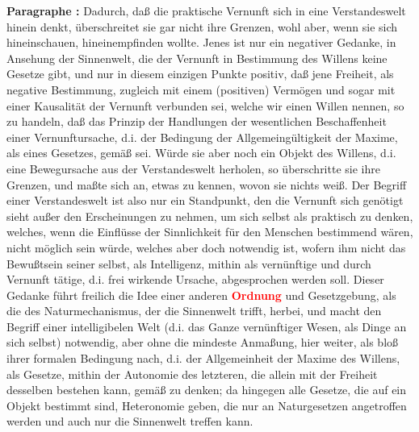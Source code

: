 \documentclass[a4paper,12pt,twoside]{book}
\newcommand{\match}[1]{\textcolor{red}{\textbf{#1}}}
\begin{document}
	\noindent\textbf{Paragraphe : }Dadurch, daß die praktische Vernunft sich in eine Verstandeswelt hinein denkt, überschreitet sie gar nicht ihre Grenzen, wohl aber, wenn sie sich hineinschauen, hineinempfinden wollte. Jenes ist nur ein negativer Gedanke, in Ansehung der Sinnenwelt, die der Vernunft in Bestimmung des Willens keine Gesetze gibt, und nur in diesem einzigen Punkte positiv, daß jene Freiheit, als negative Bestimmung, zugleich mit einem (positiven) Vermögen und sogar mit einer Kausalität der Vernunft verbunden sei, welche wir einen Willen nennen, so zu handeln, daß das Prinzip der Handlungen der wesentlichen Beschaffenheit einer Vernunftursache, d.i. der Bedingung der Allgemeingültigkeit der Maxime, als eines Gesetzes, gemäß sei. Würde sie aber noch ein Objekt des Willens, d.i. eine Bewegursache aus der Verstandeswelt herholen, so überschritte sie ihre Grenzen, und maßte sich an, etwas zu kennen, wovon sie nichts weiß. Der Begriff einer Verstandeswelt ist also nur ein Standpunkt, den die Vernunft sich genötigt sieht außer den Erscheinungen zu nehmen, um sich selbst als praktisch zu denken, welches, wenn die Einflüsse der Sinnlichkeit für den Menschen bestimmend wären, nicht möglich sein würde, welches aber doch notwendig ist, wofern ihm nicht das Bewußtsein seiner selbst, als Intelligenz, mithin als vernünftige und durch Vernunft tätige, d.i. frei wirkende Ursache, abgesprochen werden soll. Dieser Gedanke  führt freilich die Idee einer anderen \match{Ordnung} und Gesetzgebung, als die des Naturmechanismus, der die Sinnenwelt trifft, herbei, und macht den Begriff einer intelligibelen Welt (d.i. das Ganze vernünftiger Wesen, als Dinge an sich selbst) notwendig, aber ohne die mindeste Anmaßung, hier weiter, als bloß ihrer formalen Bedingung nach, d.i. der Allgemeinheit der Maxime des Willens, als Gesetze, mithin der Autonomie des letzteren, die allein mit der Freiheit desselben bestehen kann, gemäß zu denken; da hingegen alle Gesetze, die auf ein Objekt bestimmt sind, Heteronomie geben, die nur an Naturgesetzen angetroffen werden und auch nur die Sinnenwelt treffen kann. 
	
\end{document}
